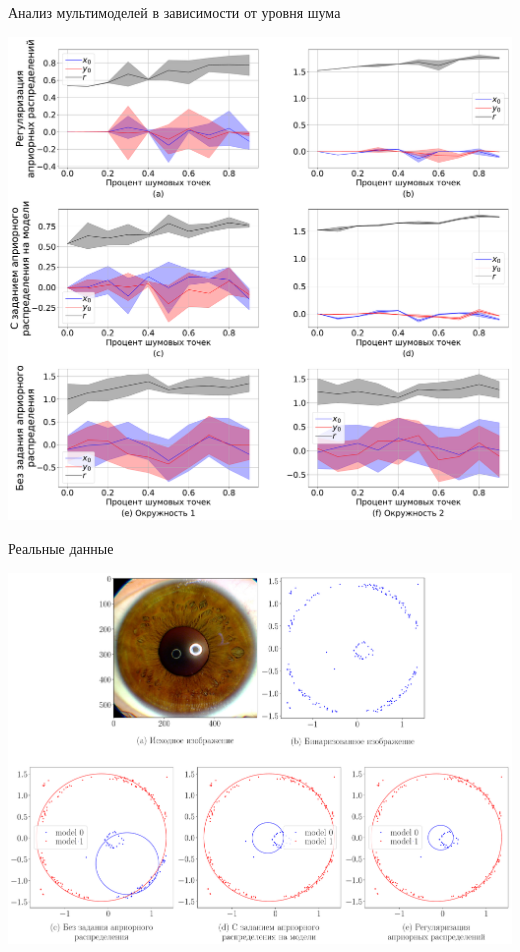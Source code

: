 \documentclass[9pt,pdf,hyperref={unicode}]{beamer}
\begin{document}
\begin{frame}{Анализ мультимоделей в зависимости от уровня шума}
\justifying
\begin{center}
	\includegraphics[height=0.9\textheight]{result/experiment_synthetic_param_progress_noise}
\end{center}

\end{frame}
\begin{frame}{Реальные данные}
\justifying
\begin{center}
	\includegraphics[height=0.9\textheight]{result/experiment_real_compare}
\end{center}

\end{frame}
\end{document}
